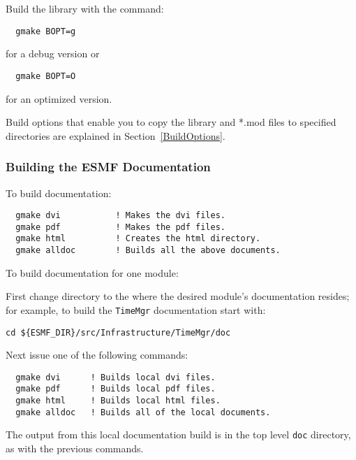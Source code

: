 

Build the library with the command:
\begin{verbatim}
  gmake BOPT=g  
\end{verbatim}
  for a debug version or
\begin{verbatim}
  gmake BOPT=O  
\end{verbatim}
  for an optimized version.


Build options that enable you to copy the library and *.mod files to
specified directories are explained in Section~\ref{BuildOptions}. 

\subsubsection{Building the ESMF Documentation}
\label{BuildDocumentation}

\noindent To build documentation:
\begin{verbatim}
  gmake dvi           ! Makes the dvi files.
  gmake pdf           ! Makes the pdf files.
  gmake html          ! Creates the html directory.
  gmake alldoc        ! Builds all the above documents.
\end{verbatim}

\noindent To build documentation for one module:

\noindent First change directory to the where the desired module's documentation resides;  for
example, to build the {\tt TimeMgr} documentation start with:

\begin{verbatim}
cd ${ESMF_DIR}/src/Infrastructure/TimeMgr/doc
\end{verbatim}

\noindent Next issue one of the following commands:
\begin{verbatim}
  gmake dvi      ! Builds local dvi files.
  gmake pdf      ! Builds local pdf files.
  gmake html     ! Builds local html files.
  gmake alldoc   ! Builds all of the local documents.
\end{verbatim}

\noindent The output from this local documentation build is in the top level {\tt doc}
directory, as with the previous commands.






